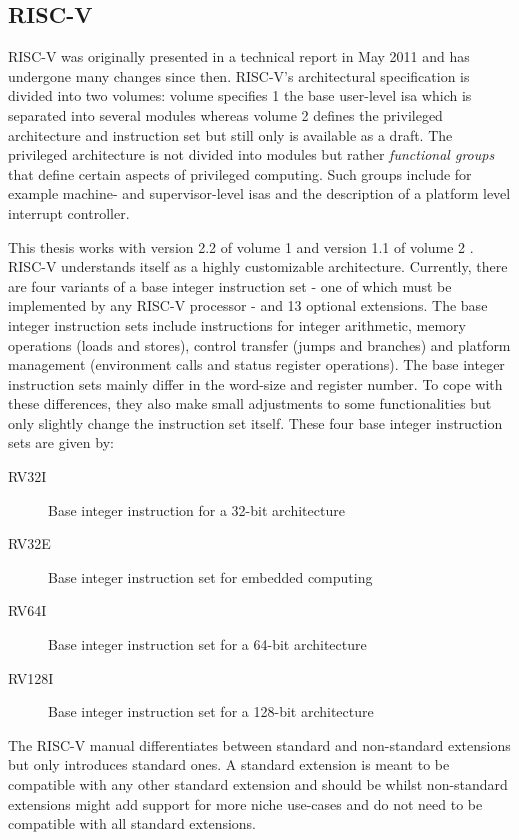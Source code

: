 \subsection{RISC-V}
\label{sec:bg-riscv}

RISC-V was originally presented in a technical report in May 2011 \cite{RiscVISA-org} and has undergone many changes since then.
RISC-V's architectural specification is divided into two volumes: volume specifies 1 the base user-level \gls{isa} which is separated into several modules whereas volume 2 defines the privileged architecture and instruction set but still only is available as a draft.
The privileged architecture is not divided into modules but rather \textit{functional groups} that define certain aspects of privileged computing.
Such groups include for example machine- and supervisor-level \glspl{isa} and the description of a platform level interrupt controller.

This thesis works with version 2.2 of volume 1 \cite{RiscVISA} and version 1.1 of volume 2 \cite{RiscVISAP}.
RISC-V understands itself as a highly customizable architecture.
Currently, there are four variants of a base integer instruction set - one of which must be implemented by any RISC-V processor - and 13 optional extensions.
The base integer instruction sets include instructions for integer arithmetic, memory operations (loads and stores), control transfer (jumps and branches) and platform management (environment calls and status register operations).
The base integer instruction sets mainly differ in the word-size and register number.
To cope with these differences, they also make small adjustments to some functionalities but only slightly change the instruction set itself.
These four base integer instruction sets are given by:
\begin{description}
    \item[RV32I] Base integer instruction  for a 32-bit architecture
    \item[RV32E] Base integer instruction set for embedded computing
    \item[RV64I] Base integer instruction set for a 64-bit architecture
    \item[RV128I] Base integer instruction set for a 128-bit architecture
\end{description}

The RISC-V manual differentiates between standard and non-standard extensions but only introduces standard ones.
A standard extension is meant to be compatible with any other standard extension and should be  whilst non-standard extensions might add support for more niche use-cases and do not need to be compatible with all standard extensions.

